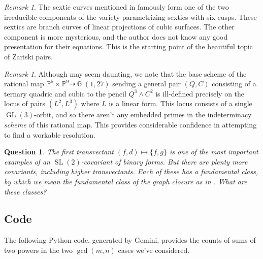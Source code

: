 \documentclass[reqno, 11pt]{amsart}
\theoremstyle{plain}
\newtheorem{question}[theorem]{Question}
\theoremstyle{remark}
\newtheorem{remark}[theorem]{Remark}
\renewcommand{\P}{\mathbb{P}}
\DeclareMathOperator{\G}{\mathbb{G}}
\DeclareMathOperator{\GL}{GL}
\DeclareMathOperator{\SL}{SL}
\begin{document}
\begin{remark}
    \label{remark:ZariskiPairs} The sextic curves mentioned in  famously form one of the two irreducible components of the variety parametrizing sextics with six cusps.  These sextics are branch curves of linear projections of cubic surfaces.  The other component is more mysterious, and the author does not know any good presentation for their equations.  This is the starting point of the beautiful topic of Zariski pairs.
\end{remark}

\begin{remark}
    \label{remark:notdaunting} Although  may seem daunting, we note that the base scheme of the rational map $\P^{5} \times \P^{9} \dashrightarrow \G(1,27)$ sending a general pair $(Q,C)$ consisting of a ternary quadric and cubic to the pencil $Q^{3} \wedge C^{2}$ is ill-defined precisely on the locus of pairs $(L^{2},L^{3})$ where $L$ is a linear form.  This locus consists of a single $\GL(3)$-orbit, and so there aren't any embedded primes in the indeterminacy {\sl scheme} of this rational map.  This provides considerable confidence in attempting to find a workable resolution.
\end{remark}

\begin{question}
    \label{question:fundamentalclassofacovariant}  The first transvectant $(f,d) \mapsto \{f,g\}$ is one of the most important examples of an $\SL(2)$-covariant of binary forms.  But there are plenty more covariants, including higher transvectants.  Each of these has a fundamental class, by which we mean the fundamental class of the graph closure as in .  What are these classes? 
\end{question}


\subsection{Code}
\label{subsection:code}

The following Python code, generated by Gemini, provides the counts of sums of two powers in the two $\gcd(m,n)$ cases we've considered. 
\end{document}
